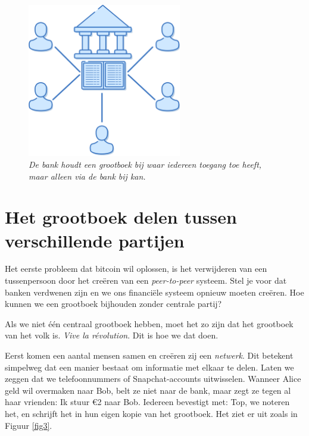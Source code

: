 \documentclass[smalldemyvopaper,11pt,twoside,onecolumn,openright,extrafontsizes]{memoir}
\begin{document}
\begin{figure}
    \centering
    \includegraphics[width=0.6\textwidth]{images/fig2.png}
    \caption{\footnotesize{\textit{De bank houdt een grootboek bij waar iedereen toegang toe heeft, maar alleen via de bank bij kan.}}}
    \label{fig2}
\end{figure}

\section{Het grootboek delen tussen verschillende partijen}

Het eerste probleem dat bitcoin wil oplossen, is het verwijderen van een tussenpersoon door het creëren van een \textit{peer-to-peer} systeem. Stel je voor dat banken verdwenen zijn en we ons financiële systeem opnieuw moeten creëren. Hoe kunnen we een grootboek bijhouden zonder centrale partij?

Als we niet één centraal grootboek hebben, moet het zo zijn dat het grootboek van het volk is. \textit{Vive la révolution}. Dit is hoe we dat doen.

Eerst komen een aantal mensen samen en creëren zij een \textit{netwerk}. Dit betekent simpelweg dat een manier bestaat om informatie met elkaar te delen. Laten we zeggen dat we telefoonnummers of Snapchat-accounts uitwisselen. Wanneer Alice geld wil overmaken naar Bob, belt ze niet naar de bank, maar zegt ze tegen al haar vrienden: \textquotedbl{}Ik stuur €2 naar Bob\textquotedbl{}. Iedereen bevestigt met: \textquotedbl{}Top, we noteren het\textquotedbl{}, en schrijft het in hun eigen kopie van het grootboek. Het ziet er uit zoals in Figuur \ref{fig3}.
\end{document}
